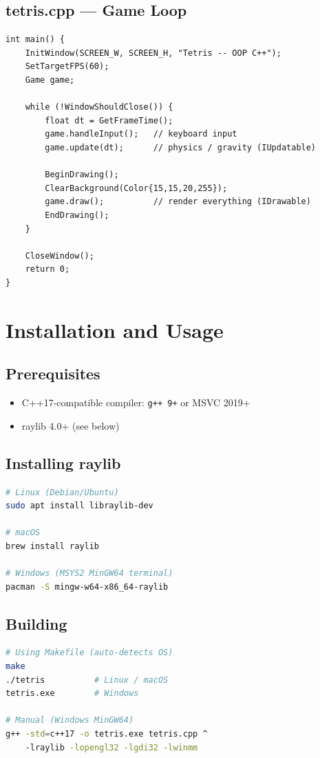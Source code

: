 \documentclass[11pt]{article}
\begin{document}
\subsection{tetris.cpp --- Game Loop}
\begin{lstlisting}[caption={Main game loop}]
int main() {
    InitWindow(SCREEN_W, SCREEN_H, "Tetris -- OOP C++");
    SetTargetFPS(60);
    Game game;

    while (!WindowShouldClose()) {
        float dt = GetFrameTime();
        game.handleInput();   // keyboard input
        game.update(dt);      // physics / gravity (IUpdatable)

        BeginDrawing();
        ClearBackground(Color{15,15,20,255});
        game.draw();          // render everything (IDrawable)
        EndDrawing();
    }

    CloseWindow();
    return 0;
}
\end{lstlisting}

\section{Installation and Usage}
\label{sec:install}

\subsection{Prerequisites}
\begin{itemize}
    \item C++17-compatible compiler: \texttt{g++ 9+} or MSVC 2019+
    \item raylib 4.0+ (see below)
\end{itemize}

\subsection{Installing raylib}
\begin{lstlisting}[language=bash, caption={Installing raylib on each platform}]
# Linux (Debian/Ubuntu)
sudo apt install libraylib-dev

# macOS
brew install raylib

# Windows (MSYS2 MinGW64 terminal)
pacman -S mingw-w64-x86_64-raylib
\end{lstlisting}

\subsection{Building}
\begin{lstlisting}[language=bash, caption={Build with Makefile or manually}]
# Using Makefile (auto-detects OS)
make
./tetris          # Linux / macOS
tetris.exe        # Windows

# Manual (Windows MinGW64)
g++ -std=c++17 -o tetris.exe tetris.cpp ^
    -lraylib -lopengl32 -lgdi32 -lwinmm
\end{lstlisting}
\end{document}
